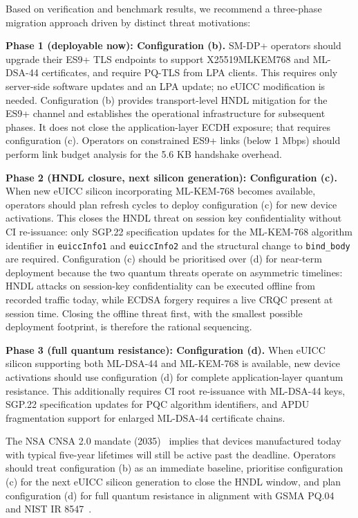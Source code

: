 \documentclass[a4paper,fleqn]{cas-sc}
\begin{document}
Based on verification and benchmark results, we recommend a three-phase
migration approach driven by distinct threat motivations:

\textbf{Phase 1 (deployable now): Configuration (b).} SM-DP+ operators
should upgrade their ES9+ TLS endpoints to support X25519MLKEM768 and
ML-DSA-44 certificates, and require PQ-TLS from LPA clients. This
requires only server-side software updates and an LPA update; no eUICC
modification is needed. Configuration (b) provides transport-level HNDL
mitigation for the ES9+ channel and establishes the operational
infrastructure for subsequent phases. It does not close the
application-layer ECDH exposure; that requires configuration (c).
Operators on constrained ES9+ links (below 1 Mbps) should perform link
budget analysis for the 5.6 KB handshake overhead.

\textbf{Phase 2 (HNDL closure, next silicon generation): Configuration (c).}
When new eUICC silicon incorporating ML-KEM-768 becomes available,
operators should plan refresh cycles to deploy configuration (c) for new
device activations. This closes the HNDL threat on session key
confidentiality without CI re-issuance: only SGP.22 specification updates
for the ML-KEM-768 algorithm identifier in \texttt{euiccInfo1} and
\texttt{euiccInfo2} and the structural change to \texttt{bind\_body} are
required. Configuration (c) should be prioritised over (d) for near-term
deployment because the two quantum threats operate on asymmetric timelines:
HNDL attacks on session-key confidentiality can be executed offline from
recorded traffic today, while ECDSA forgery requires a live CRQC present
at session time. Closing the offline threat first, with the smallest possible
deployment footprint, is therefore the rational sequencing.

\textbf{Phase 3 (full quantum resistance): Configuration (d).} When
eUICC silicon supporting both ML-DSA-44 and ML-KEM-768 is available,
new device activations should use configuration (d) for complete
application-layer quantum resistance. This additionally requires CI root
re-issuance with ML-DSA-44 keys, SGP.22 specification updates for PQC
algorithm identifiers, and APDU fragmentation support for enlarged
ML-DSA-44 certificate chains.

The NSA CNSA 2.0 mandate (2035)~\cite{nsa_cnsa2} implies that devices
manufactured today with typical five-year lifetimes will still be active
past the deadline. Operators should treat configuration (b) as an
immediate baseline, prioritise configuration (c) for the next eUICC
silicon generation to close the HNDL window, and plan configuration (d)
for full quantum resistance in alignment with GSMA PQ.04~\cite{gsma_pq04}
and NIST IR 8547~\cite{nist_ir8547}.
\end{document}
